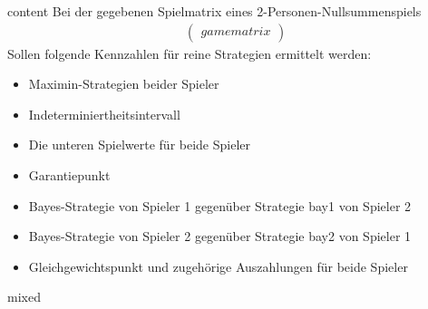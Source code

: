 \documentclass{article}
\begin{document}
{{ content }}
Bei der gegebenen Spielmatrix eines 2-Personen-Nullsummenspiels\\
\begin{gather*}
\begin{pmatrix*}
{{ gamematrix }}
\end{pmatrix*}
\end{gather*}
Sollen folgende Kennzahlen für reine Strategien ermittelt werden:\\
\begin{itemize}
\item Maximin-Strategien beider Spieler
\item Indeterminiertheitsintervall
\item Die unteren Spielwerte für beide Spieler
\item Garantiepunkt
\item Bayes-Strategie von Spieler 1 gegenüber Strategie {{ bay1 }} von Spieler 2
\item Bayes-Strategie von Spieler 2 gegenüber Strategie {{ bay2 }} von Spieler 1
\item Gleichgewichtspunkt und zugehörige Auszahlungen für beide Spieler
\end{itemize}
{{ mixed }}
\end{document}
